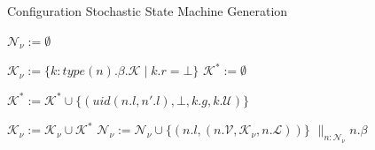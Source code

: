 \documentclass[10pt,journal,compsoc]{IEEEtran}
\DeclareMathOperator*{\concur}{\parallel}
\newtheorem{definition}{Definition}
\begin{document}
   \begin{algorithm}[tbh]
{\scriptsize
        \caption{Configuration Stochastic State Machine Generation}
        \begin{algorithmic}[1]
        \STATE $\mathcal{N_\nu := \emptyset}$

	         \STATE $\mathcal{K}_\nu := \{ k : type(n).\beta.\mathcal{K} \; | \; k.r = \bot \}$
        		\STATE $\mathcal{K}^*:=\emptyset$
       
        			\STATE $\mathcal{K}^*:= \mathcal{K}^* \cup \{ (uid(n.l,n'.l),\bot, k.g, k.\mathcal{U})\}$
	        	\ENDFOR

    	    	\STATE $\mathcal{K}_\nu := \mathcal{K}_\nu \cup \mathcal{K}^*$
           	\ENDFOR
   			\STATE $\mathcal{N}_\nu := \mathcal{N}_\nu \cup \{(n.l, (n.\mathcal{V}, \mathcal{K}_\nu, n.\mathcal{L}))\}$
        \ENDFOR
        \RETURN $\displaystyle \concur_{n:\mathcal{N}_\nu} n.\beta$ 
        \end{algorithmic}
        \label{alg:cbg}
        }
      \end{algorithm}





\end{document}
